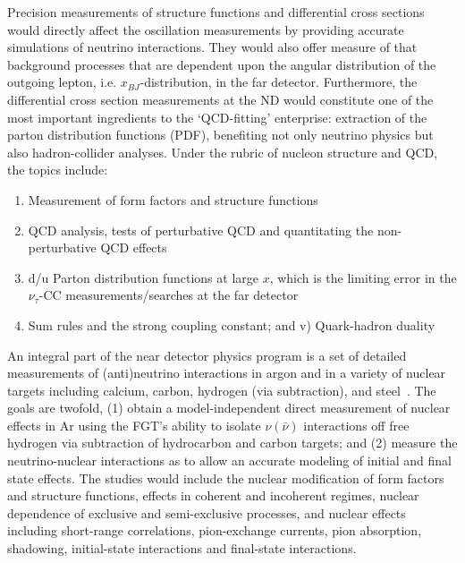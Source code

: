 Precision measurements of  structure functions and 
differential cross sections would directly affect the oscillation measurements 
by providing accurate simulations of neutrino interactions. They would also offer measure of 
that background processes that are dependent upon the angular distribution of 
the outgoing lepton, i.e. $x_{BJ}$-distribution, in the far detector. 
Furthermore, the differential cross section measurements at the ND would 
constitute one of the most important ingredients to the `QCD-fitting' enterprise: 
extraction of the parton distribution functions (PDF), benefiting not only 
 neutrino physics but also hadron-collider analyses. 
Under the rubric of nucleon structure and QCD, the topics  include: 
\begin{enumerate}
\item Measurement of form factors and structure functions
\item QCD analysis,  tests of perturbative QCD and quantitating the non-perturbative 
QCD effects
\item d/u Parton distribution functions at large $x$, which is the limiting error in the 
$\nu_\tau$-CC measurements/searches at the far detector
\item Sum rules and the strong coupling constant; and v) Quark-hadron duality
\end{enumerate}

An integral part of the near detector physics program is a set of detailed measurements of (anti)neutrino 
interactions in argon and in a variety of nuclear targets including calcium, carbon, hydrogen (via subtraction), 
and steel~\cite{near-detector-NUCL}. 
The goals are twofold, (1) obtain a model-independent direct measurement of nuclear effects in Ar 
using the FGT's ability to isolate $\nu (\bar \nu)$ interactions off free hydrogen 
via subtraction of hydrocarbon and carbon targets; and
(2) measure the neutrino-nuclear interactions as to allow an accurate modeling 
of initial and final state effects. The studies would include 
the nuclear modification of form factors and structure functions, effects in coherent and incoherent 
regimes, nuclear dependence of exclusive and semi-exclusive processes, and nuclear 
effects including short-range correlations, pion-exchange currents, pion absorption, shadowing, 
initial-state interactions and final-state interactions. 

